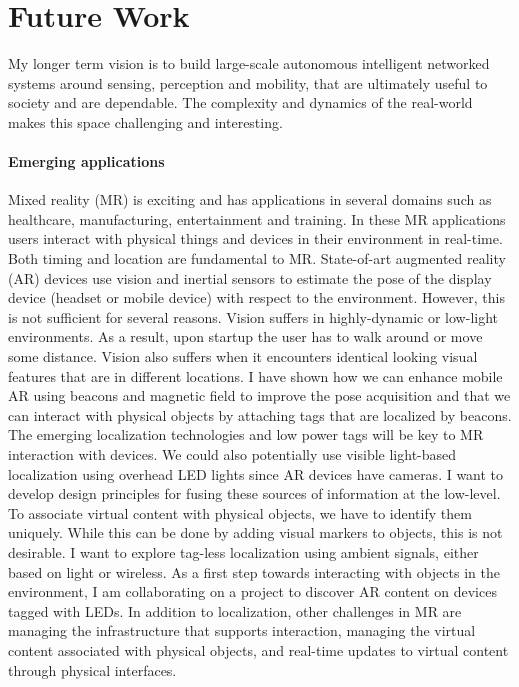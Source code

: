 \documentclass[10pt]{article}
\begin{document}
\section{Future Work}
My longer term vision is to build large-scale autonomous intelligent
networked systems around sensing, perception and mobility, that are
ultimately useful to society and are dependable.  The complexity and
dynamics of the real-world makes this space challenging and
interesting.


\paragraph{Emerging applications}
Mixed reality (MR) is exciting and has applications in several domains
such as healthcare, manufacturing, entertainment and training. In
these MR applications users interact with physical things and devices
in their environment in real-time.  Both timing and location are
fundamental to MR. State-of-art augmented reality (AR) devices use
vision and inertial sensors to estimate the pose of the display device
(headset or mobile device) with respect to the environment. However,
this is not sufficient for several reasons. Vision suffers in
highly-dynamic or low-light environments. As a result, upon startup
the user has to walk around or move some distance. Vision also suffers
when it encounters identical looking visual features that are in
different locations. I have shown how we can enhance mobile AR using
beacons and magnetic field to improve the pose acquisition \cite{} and
that we can interact with physical objects by attaching tags that are
localized by beacons. The emerging localization technologies and low
power tags will be key to MR interaction with devices. We could also
potentially use visible light-based localization using overhead LED
lights since AR devices have cameras. I want to develop design
principles for fusing these sources of information at the
low-level. To associate virtual content with physical objects, we have
to identify them uniquely. While this can be done by adding visual
markers to objects, this is not desirable. I want to explore tag-less
localization using ambient signals, either based on light or
wireless. As a first step towards interacting with objects in the
environment, I am collaborating on a project to discover AR content on
devices tagged with LEDs. In addition to localization, other
challenges in MR are managing the infrastructure that supports
interaction, managing the virtual content associated with physical
objects, and real-time updates to virtual content through physical
interfaces.
\end{document}
